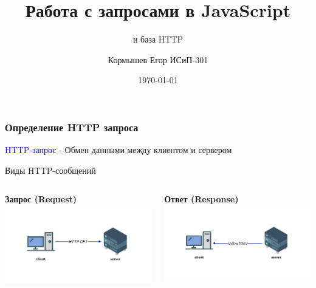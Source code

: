 \documentclass[aspectratio=169]{beamer}
\title{Работа с запросами в JavaScript}
\subtitle{и база HTTP}
\author{Кормышев Егор ИСиП-301}
\date{\today}
\begin{document}
\frame{\titlepage}


\begin{frame}
  \frametitle{Определение HTTP запроса}

  \large\textcolor{blue}{HTTP-запрос} - \normalsize Обмен данными между клиентом и сервером
  
  \bigskip

  \begin{center}
    \large Виды HTTP-сообщений
  \end{center}

  \begin{columns}
    
    \begin{column}{0.5\textwidth}
      \centering
      \large \textbf{Запрос (Request)}
 \includegraphics[width=1.2\textwidth]{assets/request.png}
    \end{column}
    
    
    \begin{column}{0.5\textwidth}
      \centering
      \large \textbf{Ответ (Response)}
      \includegraphics[width=1.2\textwidth]{assets/response.png}
    \end{column}

  \end{columns}


\end{frame}
\end{document}
